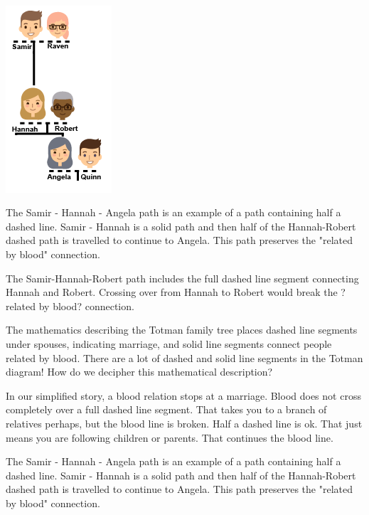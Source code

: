 \documentclass{ximera}
\begin{document}
\begin{notation}
\quad \\

\begin{image}
\includegraphics{pics/Samir_Hannah_Angela.png}
\end{image}

The Samir - Hannah - Angela path is an example of a path containing half a dashed line. Samir - Hannah is a solid path and then half of the Hannah-Robert dashed path is travelled to continue to Angela.  This path preserves the "related by blood" connection.

The Samir-Hannah-Robert path includes the full dashed line segment connecting Hannah and Robert.  Crossing over from Hannah to Robert would break the ?related by blood? connection.

\end{notation}







The mathematics describing the Totman family tree places dashed line segments under spouses, indicating marriage, and solid line segments connect people related by blood. There are a lot of dashed and solid line segments in the Totman diagram!  How do we decipher this mathematical description?

In our simplified story, a blood relation stops at a marriage.  Blood does not cross completely over a full dashed line segment. That takes you to a branch of relatives perhaps, but the blood line is broken.  Half a dashed line is ok.  That just means you are following children or parents.  That continues the blood line.

The Samir - Hannah - Angela path is an example of a path containing half a dashed line. Samir - Hannah is a solid path and then half of the Hannah-Robert dashed path is travelled to continue to Angela.  This path preserves the "related by blood" connection.
\end{document}
